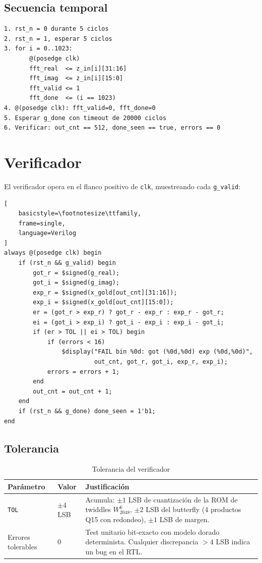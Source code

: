 \documentclass[12pt, a4paper]{article}
\begin{document}
\subsection{Secuencia temporal}

\begin{Verbatim}[fontsize=\footnotesize, frame=single]
1. rst_n = 0 durante 5 ciclos
2. rst_n = 1, esperar 5 ciclos
3. for i = 0..1023:
       @(posedge clk)
       fft_real  <= z_in[i][31:16]
       fft_imag  <= z_in[i][15:0]
       fft_valid <= 1
       fft_done  <= (i == 1023)
4. @(posedge clk): fft_valid=0, fft_done=0
5. Esperar g_done con timeout de 20000 ciclos
6. Verificar: out_cnt == 512, done_seen == true, errors == 0
\end{Verbatim}

\section{Verificador}

El verificador opera en el flanco positivo de \texttt{clk}, muestreando cada
\texttt{g\_valid}:

\begin{lstlisting}[
    basicstyle=\footnotesize\ttfamily,
    frame=single,
    language=Verilog
]
always @(posedge clk) begin
    if (rst_n && g_valid) begin
        got_r = $signed(g_real);
        got_i = $signed(g_imag);
        exp_r = $signed(x_gold[out_cnt][31:16]);
        exp_i = $signed(x_gold[out_cnt][15:0]);
        er = (got_r > exp_r) ? got_r - exp_r : exp_r - got_r;
        ei = (got_i > exp_i) ? got_i - exp_i : exp_i - got_i;
        if (er > TOL || ei > TOL) begin
            if (errors < 16)
                $display("FAIL bin %0d: got (%0d,%0d) exp (%0d,%0d)",
                         out_cnt, got_r, got_i, exp_r, exp_i);
            errors = errors + 1;
        end
        out_cnt = out_cnt + 1;
    end
    if (rst_n && g_done) done_seen = 1'b1;
end
\end{lstlisting}

\subsection{Tolerancia}

\begin{table}[H]
\centering
\caption{Tolerancia del verificador}
\begin{tabular}{p{3cm} p{2.5cm} p{8cm}}
\toprule
\textbf{Parámetro} & \textbf{Valor} & \textbf{Justificación} \\
\midrule
\texttt{TOL}       & $\pm 4$ LSB &
  Acumula: $\pm1$ LSB de cuantización de la ROM de twiddles $W_{2048}^k$,
  $\pm2$ LSB del butterfly (4 productos Q15 con redondeo), $\pm1$ LSB de
  margen. \\
Errores tolerables & 0 &
  Test unitario bit-exacto con modelo dorado determinista. Cualquier
  discrepancia $>4$ LSB indica un bug en el RTL. \\
\bottomrule
\end{tabular}
\end{table}
\end{document}

